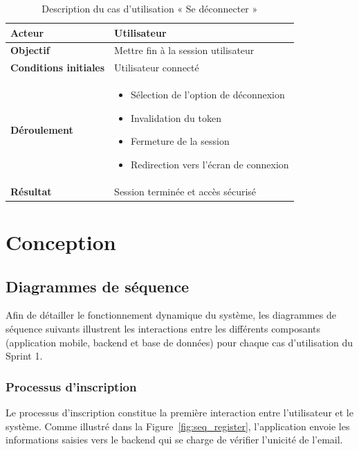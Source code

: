 \begin{table}[H]
\centering
\renewcommand{\arraystretch}{1.2}
\begin{tabular}{|p{4cm}|p{10cm}|}
\hline
\textbf{Acteur} & Utilisateur \\ \hline

\textbf{Objectif} & Mettre fin à la session utilisateur \\ \hline

\textbf{Conditions initiales} & Utilisateur connecté \\ \hline

\textbf{Déroulement} & 
\begin{itemize}
    \item Sélection de l’option de déconnexion
    \item Invalidation du token
    \item Fermeture de la session
    \item Redirection vers l’écran de connexion
\end{itemize} \\ \hline

\textbf{Résultat} & Session terminée et accès sécurisé \\ \hline
\end{tabular}
\caption{Description du cas d’utilisation « Se déconnecter »}
\label{tab:uc_logout}
\end{table}

\section{Conception}
\subsection{Diagrammes de séquence}

Afin de détailler le fonctionnement dynamique du système, les diagrammes de séquence suivants illustrent les interactions entre les différents composants (application mobile, backend et base de données) pour chaque cas d’utilisation du Sprint 1.

\subsubsection{Processus d’inscription}

Le processus d’inscription constitue la première interaction entre l’utilisateur et le système. Comme illustré dans la Figure~\ref{fig:seq_register}, l’application envoie les informations saisies vers le backend qui se charge de vérifier l’unicité de l’email. 

